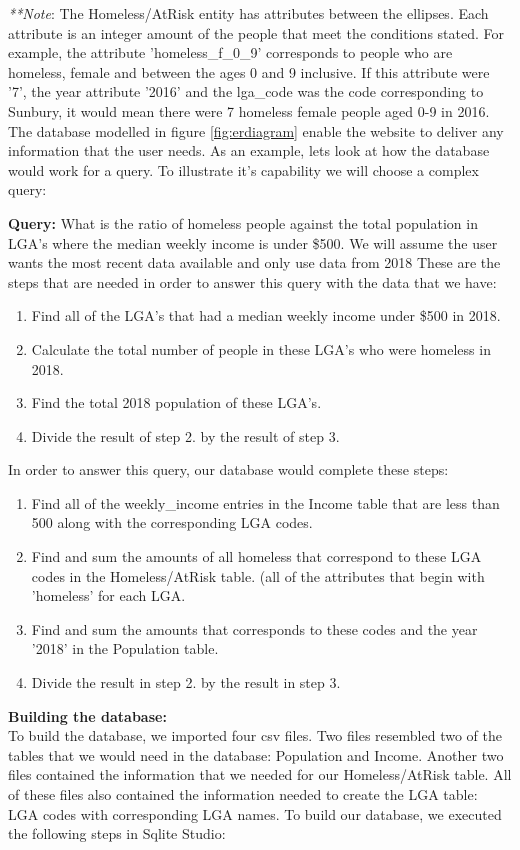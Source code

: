 \documentclass[12pt, a4paper]{article}
\begin{document}
\emph{**Note}: The Homeless/AtRisk entity has attributes between the ellipses. Each attribute is an integer amount of the people that meet the conditions stated. For example, the attribute 'homeless\_f\_0\_9' corresponds to people who are homeless, female and between the ages 0 and 9 inclusive. If this attribute were '7', the year attribute '2016' and the lga\_code was the code corresponding to Sunbury, it would mean there were 7 homeless female people aged 0-9 in 2016.\\

The database modelled in figure \ref{fig:erdiagram} enable the website to deliver any information that the user needs. As an example, lets look at how the database would work for a query. To illustrate it's capability we will choose a complex query:

\textbf{Query:} What is the ratio of homeless people against the total population in LGA's where the median weekly income is under \$500. We will assume the user wants the most recent data available and only use data from 2018
These are the steps that are needed in order to answer this query with the data that we have:
\begin{enumerate}
\item Find all of the LGA's that had a median weekly income under \$500 in 2018.
\item Calculate the total number of people in these LGA's who were homeless in 2018.
\item Find the total 2018 population of these LGA's.
\item Divide the result of step 2. by the result of step 3.
\end{enumerate}
In order to answer this query, our database would complete these steps:
\begin{enumerate}
\item Find all of the weekly\_income entries in the Income table that are less than 500 along with the corresponding LGA codes.
\item Find and sum the amounts of all homeless that correspond to these LGA codes in the Homeless/AtRisk table. (all of the attributes that begin with 'homeless' for each LGA.
\item Find and sum the amounts that corresponds to these codes and the year '2018' in the Population table.
\item Divide the result in step 2. by the result in step 3.
\end{enumerate} 

\textbf{Building the database:} \\
To build the database, we imported four csv files. Two files resembled two of the tables that we would need in the database: Population and Income. Another two files contained the information that we needed for our Homeless/AtRisk table. All of these files also contained the information needed to create the LGA table: LGA codes with corresponding LGA names. To build our database, we executed the following steps in Sqlite Studio:
\end{document}
